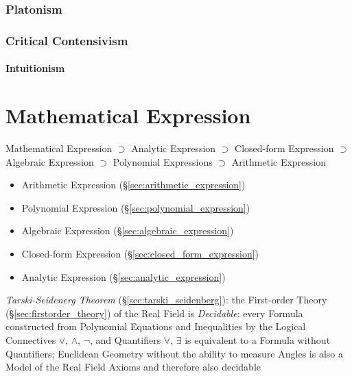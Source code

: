 \subsubsection{Platonism}\label{sec:platonism}

\subsubsection{Critical Contensivism}\label{sec:critical_contensivism}

\paragraph{Intuitionism}\label{sec:intuitionism}\hfill



\section{Mathematical Expression}\label{sec:mathematical_expression}

Mathematical Expression $\supset$
Analytic Expression     $\supset$
Closed-form Expression  $\supset$
Algebraic Expression    $\supset$
Polynomial Expressions  $\supset$
Arithmetic Expression

\begin{itemize}
  \item Arithmetic Expression (\S\ref{sec:arithmetic_expression})
  \item Polynomial Expression (\S\ref{sec:polynomial_expression})
  \item Algebraic Expression (\S\ref{sec:algebraic_expression})
  \item Closed-form Expression (\S\ref{sec:closed_form_expression})
  \item Analytic Expression (\S\ref{sec:analytic_expression})
\end{itemize}

\emph{Tarski-Seidenerg Theorem} (\S\ref{sec:tarski_seidenberg}): the First-order
Theory (\S\ref{sec:firstorder_theory}) of the Real Field is \emph{Decidable}:
every Formula constructed from Polynomial Equations and Inequalities by the
Logical Connectives $\vee$, $\wedge$, $\neg$, and Quantifiers $\forall$,
$\exists$ is equivalent to a Formula without Quantifiers; Euclidean Geometry
without the ability to measure Angles is also a Model of the Real Field Axioms
and therefore also decidable

